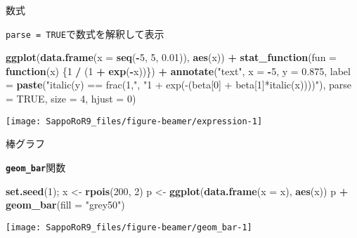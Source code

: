 \documentclass[ignorenonframetext,]{beamer}
\newenvironment{Shaded}{\begin{snugshade}}{\end{snugshade}}
\newcommand{\KeywordTok}[1]{\textcolor[rgb]{0.13,0.29,0.53}{\textbf{#1}}}
\newcommand{\DataTypeTok}[1]{\textcolor[rgb]{0.13,0.29,0.53}{#1}}
\newcommand{\DecValTok}[1]{\textcolor[rgb]{0.00,0.00,0.81}{#1}}
\newcommand{\FloatTok}[1]{\textcolor[rgb]{0.00,0.00,0.81}{#1}}
\newcommand{\StringTok}[1]{\textcolor[rgb]{0.31,0.60,0.02}{#1}}
\newcommand{\OtherTok}[1]{\textcolor[rgb]{0.56,0.35,0.01}{#1}}
\newcommand{\ControlFlowTok}[1]{\textcolor[rgb]{0.13,0.29,0.53}{\textbf{#1}}}
\newcommand{\OperatorTok}[1]{\textcolor[rgb]{0.81,0.36,0.00}{\textbf{#1}}}
\newcommand{\NormalTok}[1]{#1}
\let\oldShaded\Shaded
\let\endoldShaded\endShaded
\renewenvironment{Shaded}{\footnotesize\oldShaded}{\endoldShaded}
\begin{document}
\begin{frame}[fragile]{数式}

\texttt{parse\ =\ TRUE}で数式を解釈して表示

\begin{Shaded}
\begin{Highlighting}[]
\KeywordTok{ggplot}\NormalTok{(}\KeywordTok{data.frame}\NormalTok{(}\DataTypeTok{x =} \KeywordTok{seq}\NormalTok{(}\OperatorTok{-}\DecValTok{5}\NormalTok{, }\DecValTok{5}\NormalTok{, }\FloatTok{0.01}\NormalTok{)), }\KeywordTok{aes}\NormalTok{(x)) }\OperatorTok{+}
\StringTok{  }\KeywordTok{stat_function}\NormalTok{(}\DataTypeTok{fun =} \ControlFlowTok{function}\NormalTok{(x) \{}\DecValTok{1} \OperatorTok{/}\StringTok{ }\NormalTok{(}\DecValTok{1} \OperatorTok{+}\StringTok{ }\KeywordTok{exp}\NormalTok{(}\OperatorTok{-}\NormalTok{x))\}) }\OperatorTok{+}
\StringTok{  }\KeywordTok{annotate}\NormalTok{(}\StringTok{"text"}\NormalTok{, }\DataTypeTok{x =} \OperatorTok{-}\DecValTok{5}\NormalTok{, }\DataTypeTok{y =} \FloatTok{0.875}\NormalTok{,}
      \DataTypeTok{label =} \KeywordTok{paste}\NormalTok{(}\StringTok{"italic(y) == frac(1,"}\NormalTok{, }
                    \StringTok{"1 + exp(-(beta[0] + beta[1]*italic(x))))"}\NormalTok{),}
      \DataTypeTok{parse =} \OtherTok{TRUE}\NormalTok{, }\DataTypeTok{size =} \DecValTok{4}\NormalTok{, }\DataTypeTok{hjust =} \DecValTok{0}\NormalTok{)}
\end{Highlighting}
\end{Shaded}

\texttt{[image: SappoRoR9\_files/figure-beamer/expression-1]}

\end{frame}

\begin{frame}[fragile]{棒グラフ}

\textbf{\texttt{geom\_bar}}関数

\begin{Shaded}
\begin{Highlighting}[]
\KeywordTok{set.seed}\NormalTok{(}\DecValTok{1}\NormalTok{); x <-}\StringTok{ }\KeywordTok{rpois}\NormalTok{(}\DecValTok{200}\NormalTok{, }\DecValTok{2}\NormalTok{)}
\NormalTok{p <-}\StringTok{ }\KeywordTok{ggplot}\NormalTok{(}\KeywordTok{data.frame}\NormalTok{(}\DataTypeTok{x =}\NormalTok{ x), }\KeywordTok{aes}\NormalTok{(x))}
\NormalTok{p }\OperatorTok{+}\StringTok{ }\KeywordTok{geom_bar}\NormalTok{(}\DataTypeTok{fill =} \StringTok{"grey50"}\NormalTok{)}
\end{Highlighting}
\end{Shaded}

\texttt{[image: SappoRoR9\_files/figure-beamer/geom\_bar-1]}

\end{frame}
\end{document}
